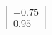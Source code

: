 \documentclass[preview]{standalone}
\begin{document}
\begin{align*}
\begin{bmatrix} -0.75 \\ 0.95 \end{bmatrix}
\end{align*}
\end{document}
